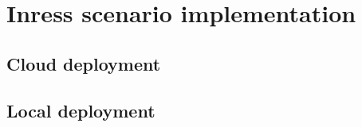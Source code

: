 \section{Inress scenario implementation}
\label{sec:ingressImpl}

\subsection{Cloud deployment}
\label{sec:cloudIngressImpl}
\subsection{Local deployment}
\label{sec:localIngressImpl}



